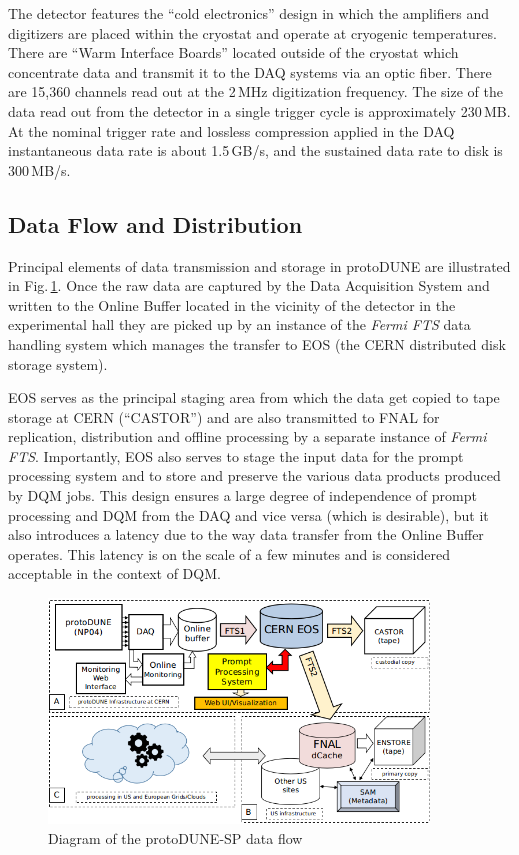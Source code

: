 \documentclass{webofc}
\newcommand{\pd}{protoDUNE\xspace}
\begin{document}
The detector features the ``cold electronics'' design in which the amplifiers and digitizers
are placed within the cryostat and operate at cryogenic temperatures. There are
``Warm Interface Boards'' located outside of the cryostat which concentrate data
and transmit it to the DAQ systems via an optic fiber.
There are 15,360 channels read out at the 2\,MHz digitization frequency. The size of the data
read out from the detector in a single trigger cycle is approximately 230\,MB. At the nominal
trigger rate and lossless compression applied in the DAQ instantaneous data rate is about
1.5\,GB/s, and the sustained data rate to disk is 300\,MB/s.

\subsection{Data Flow and Distribution}
Principal elements of data transmission and storage in \pd are illustrated in Fig.\,\ref{fig:dataflow}.
Once the raw data are captured by the Data Acquisition System and written to the Online Buffer
located in the vicinity of the detector in the experimental hall  they are picked up by an instance of
the \textit{Fermi FTS} data handling system \cite{sam,fts} which manages the transfer to EOS \cite{castoreos}
(the CERN distributed disk storage system).

EOS serves as the principal staging area  \cite{eos_role} from which the data get copied to tape
storage at CERN (``CASTOR'')  and are also transmitted to FNAL for replication, distribution and
offline processing by a separate instance of \textit{Fermi FTS}.
Importantly, EOS also serves to stage the input data for the prompt processing system and to
store and preserve  the various data products produced by DQM jobs. This design
ensures a large degree of independence of prompt processing and DQM from the DAQ and vice versa
(which is desirable),
but it also introduces a latency due to the way data transfer from the Online Buffer operates. This latency
is on the scale of a few minutes and is considered acceptable in the context of DQM.

\begin{figure}[tb]
\centering\includegraphics[width=0.9\textwidth]{figures/protoDUNE_data_flow_2018_v1.png}
\caption{\label{fig:dataflow}Diagram of the protoDUNE-SP data flow}
\end{figure}
\end{document}
